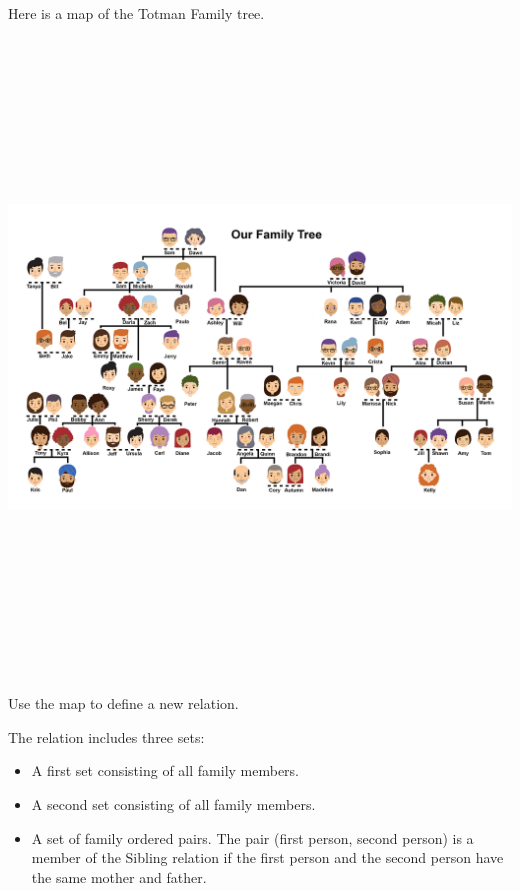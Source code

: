 \documentclass{ximera}
\begin{document}
\begin{exercise}
  Here is a map of the Totman Family tree.
  
  
  \begin{image}
    \includegraphics[width=1050px,height=638px]{pics/Totman_Tree_small.png}
  \end{image}
  
  Use the map to define a new relation.
  \begin{definition}
  The  relation includes three sets:
    \begin{itemize}
    \item A first set consisting of all family members.
    \item A second set consisting of all family members.
    \item A set of family ordered pairs. The pair (first person, second person) is a member of the Sibling relation if the first person and the second person have the same mother and father.
    \end{itemize}
  
  \end{definition}
  
\end{exercise}
\end{document}
